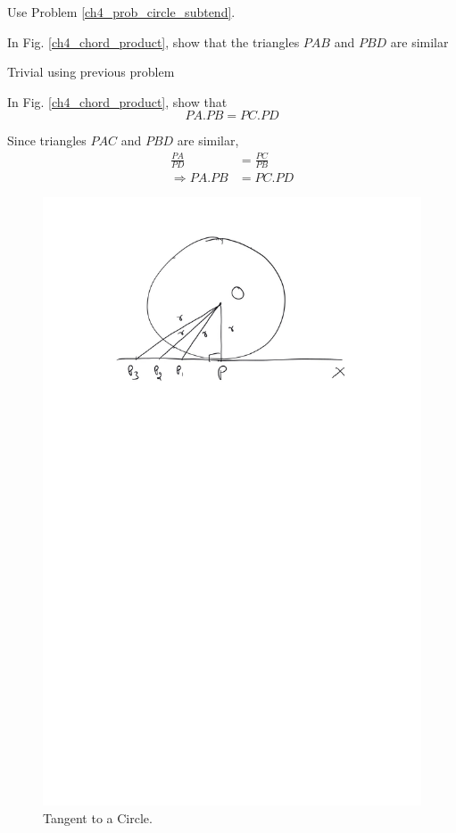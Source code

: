 %
\proof Use Problem \ref{ch4_prob_circle_subtend}.
%
\begin{problem}
	In Fig. \ref{ch4_chord_product}, show that the triangles $PAB$ and $PBD$ are similar
\end{problem}
\proof Trivial using previous problem
\begin{problem}
	In Fig. \ref{ch4_chord_product}, show that 
	\begin{equation}
	PA.PB = PC.PD
	\end{equation}
\end{problem}
%
\proof Since triangles $PAC$ and $PBD$ are similar, 
%
\begin{align}
\frac{PA}{PD} &= \frac{PC}{PB} \\
\Rightarrow PA.PB &= PC.PD
\end{align}
%
%
\begin{figure}[!h]
	\begin{center}
		
		\includegraphics[width=\columnwidth]{./figs/ch4_tangent_def}
		\vspace*{-10cm}
	\end{center}
	\caption{Tangent to a Circle.}
	\label{ch4_tangent_def}	
\end{figure}
